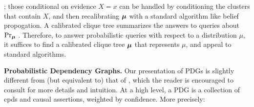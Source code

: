     \parencite[see][\S 10.3.3]{koller2009probabilistic};
    those conditional on evidence $X{=}x$ can be handled
    by conditioning the clusters that contain $X$,
    and then recalibrating $\boldsymbol\mu$ with 
    a standard algorithm like belief propogation.
\else
A calibrated clique tree summarizes the answers to 
queries about $\Pr_{\boldsymbol\mu}$
\parencite[see][\S 10.3.3]{koller2009probabilistic}.
\fi
Therefore, to answer probabilistic queries with respect to a distribution $\mu$, it suffices to find a calibrated clique tree $\boldsymbol\mu$ that represents $\mu$, and appeal to standard algorithms.

\textbf{Probabilistic Dependency Graphs.}
Our presentation of PDGs is slightly
different from (but equivalent to) that of
\textcite{pdg-aaai}, which
the reader is encouraged to consult for more details and intuition.
At a high level, a PDG
is
a collection of cpds and causal assertions,
    weighted by confidence. More precisely:

